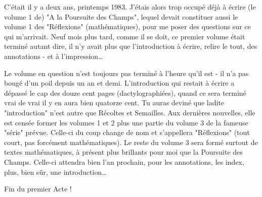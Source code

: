 C'était il y a deux ans, printemps 1983. J'étais alors trop occupé déjà à écrire (le volume 1 de) "A la Poursuite des Champs", lequel devait constituer aussi le volume 1 des "Réflexions" (mathématiques), pour me poser des questions sur ce qui m'arrivait. Neuf mois plus tard, comme il se doit, ce premier volume était terminé autant dire, il n'y avait plus que l'introduction à écrire, relire le tout, des annotations - et à l'impression\ldots

Le volume en question n'est toujours pas terminé à l'heure qu'il est - il n'a pas bougé d'un poil depuis un an et demi. L'introduction qui restait à écrire a dépassé le cap des douze cent pages (dactylographiées), quand ce sera terminé vrai de vrai il y en aura bien quatorze cent. Tu auras deviné que ladite "introduction" n'est autre que Récoltes et Semailles. Aux dernières nouvelles, elle est censée former les volumes 1 et 2 plus une partie du volume 3 de la fameuse "série" prévue. Celle-ci du coup change de nom et s'appellera "Réflexions" (tout court, pas forcément mathématiques). Le reste du volume 3 sera formé surtout de textes mathématiques, à présent plus brillants pour moi que la Poursuite des Champs. Celle-ci attendra bien l'an prochain, pour les annotations, les index, plus, bien sûr, une introduction\ldots

Fin du premier Acte !